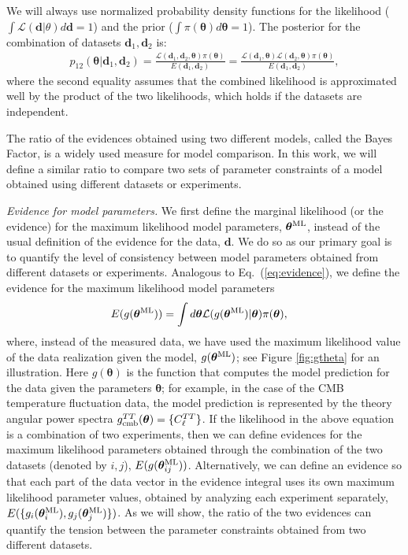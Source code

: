 \documentclass[amsmath, amssymb, reprint, aps]{revtex4-1}
\newcommand{\dv}{\textbf{d}}
\newcommand{\tv}{\bm{\theta}}
\newcommand{\tML}{\tv^{\rm ML}}
\begin{document}
    We will always use normalized probability density functions for the likelihood ($\int \mathcal{L}(\dv|\theta) d\dv = 1$) and the prior  ($\int \pi(\tv) d \tv =1$). The posterior for the combination of datasets $\dv_1, \dv_2$ is:
    \begin{equation}
    \begin{aligned}
    \!\!\!
    p_{12}(\tv|\dv_1,\dv_2) = \frac{\mathcal{L}(\dv_1, \dv_2, \tv) \pi(\tv)}{E(\dv_1, \dv_2)}   = \frac{\mathcal{L}(\dv_1, \tv) \mathcal{L}(\dv_2, \tv) \pi(\tv)}{E(\dv_1, \dv_2)},
    \end{aligned}
    \end{equation}
    where the second equality assumes that the combined likelihood is approximated well by the product of the two likelihoods, which holds if the datasets are independent.
    
    The ratio of the evidences obtained using two different models, called the Bayes Factor, is a widely used measure for model comparison. In this work, we will define a similar ratio to compare two sets of parameter constraints of a model obtained using different datasets or experiments. 
    
    \medskip
    \textit{Evidence for model parameters.}
    We first define the marginal likelihood (or the evidence) for the maximum likelihood model parameters, $\tML$, instead of the usual definition of the evidence for the data, $\dv$. We do so as our primary goal is to quantify the level of consistency between model parameters obtained from different datasets or experiments. Analogous to Eq.~(\ref{eq:evidence}), we define the evidence for the maximum likelihood model parameters
    \begin{align}
        E(g(\tML)) &= \int d\tv \mathcal{L}(g(\tML)|\tv) \pi(\tv),
    \end{align}
    where, instead of the measured data, we have used the maximum likelihood value of the data realization given the model, $g(\tML)$; see Figure \ref{fig:gtheta} for an illustration. Here $g(\tv)$ is the function that computes the model prediction for the data given the parameters $\tv$; for example, in the case of the CMB temperature fluctuation data, the model prediction is represented by the theory angular power spectra $g_{\rm cmb}^{TT}(\tv) = \{C_\ell^{TT}\}$. If the likelihood in the above equation is a combination of two experiments, then we can define evidences for the maximum likelihood parameters obtained through the combination of the two datasets (denoted by $i,j$), $E(g(\tML_{ij}))$. Alternatively, we can define an evidence so that each part of the data vector in the evidence integral uses its own maximum likelihood parameter values, obtained by analyzing each experiment separately, $E(\{g_i(\tML_i), g_j(\tML_j)\})$. As we will show, the ratio of the two evidences can quantify the tension between the parameter constraints obtained from two different datasets.
    
\end{document}
